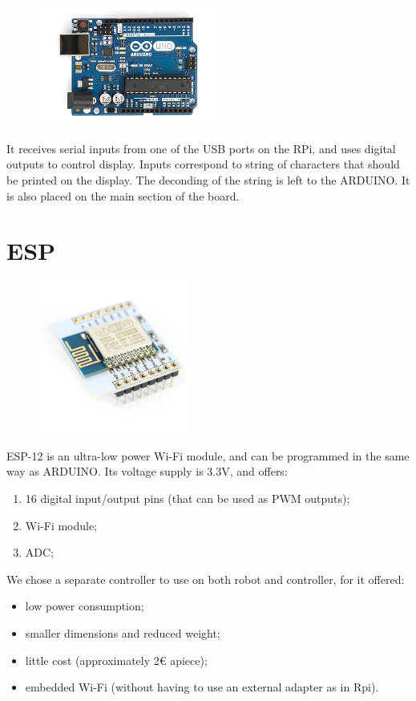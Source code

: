 \documentclass[a4paper,twoside]{book}
\begin{document}
\begin{appendices}
\begin{figure}
    \centering
    \includegraphics[width=6cm]{img/ArduinoUno}
\end{figure}

It receives serial inputs from one of the USB ports on the RPi, and uses digital outputs to control display. Inputs correspond to string of characters that should be printed on the display. The deconding of the string is left to the ARDUINO. 
It is also placed on the main section of the board.

\section{ESP}
\label{app:ESP}

\begin{figure}[h]
    \centering
    \includegraphics[width=5cm]{img/ESP12}
\end{figure}

\beforelist* ESP-12  is an ultra-low power Wi-Fi module, and can be programmed in the same way as ARDUINO. Its voltage supply is 3.3V, and offers:
\begin{enumerate}
\item 16 digital input/output pins (that can be used as PWM outputs);
\item Wi-Fi module;
\item ADC; 
\end{enumerate}
\afterlist
\beforelist We chose a separate controller to use on both robot and controller, for it offered:
\begin{itemize}
\item low power consumption; 
\item smaller dimensions and reduced weight;
\item little cost (approximately 2\euro{} apiece);
\item embedded Wi-Fi (without having to use an external adapter as in Rpi).
\end{itemize}
\afterlist*


\end{appendices}
\end{document}
